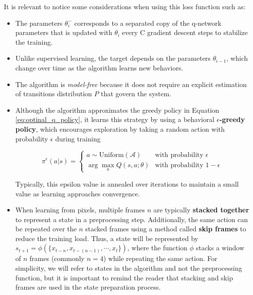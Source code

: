 It is relevant to notice some considerations when using this loss function such as:

\begin{itemize}
    \item The parameters $\theta^-_{i}$ corresponds to a separated copy of the q-network parameters that is updated with $\theta_{i}$ every C gradient descent steps to stabilize the training.
    \item Unlike supervised learning, the target depends on the parameters $\theta_{i-1}$, which change over time as the algorithm learns new behaviors.
    \item The algorithm is \textit{model-free} because it does not require an explicit estimation of transitions distribution $P$ that govern the system.
    \item Although the algorithm approximates the greedy policy in Equation \ref{eq:optinal_q_policy}, it learns this strategy by using a behavioral \textbf{$\epsilon$-greedy policy}, which encourages exploration by taking a random action with probability $\epsilon$ during training 

    \begin{equation}
        \pi^\epsilon(a | s) = 
        \begin{cases} 
        a \sim \text{Uniform}(\mathcal{A}) & \text{with probability } \epsilon \\
        \arg\max_{a} Q(s, a; \theta) & \text{with probability } 1 - \epsilon
        \end{cases}
    \end{equation}
    
    Typically, this epsilon value is annealed over iterations to maintain a small value as learning approaches convergence.
    \item When learning from pixels, multiple frames $n$ are typically \textbf{stacked together} to represent a state in a preprocessing step. Additionally, the same action can be repeated over the $n$ stacked frames using a method called \textbf{skip frames} to reduce the training load. Thus, a state will be represented by $s_{t+1} = \phi(\{x_{t-n}, x_{t-(n-1)}, \cdots, x_{t}\})$, where the function $\phi$ stacks a window of $n$ frames (commonly $n=4$) while repeating the same action. For simplicity, we will refer to states in the algorithm and not the preprocessing function, but it is important to remind the reader that stacking and skip frames are used in the state preparation process.
\end{itemize}


